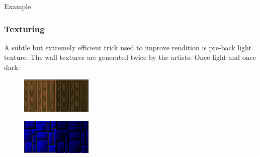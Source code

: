 Example























\subsubsection{Texturing}
A subtle but extremely efficient trick used to improve rendition is pre-back light texture. The wall textures are generated twice by the artists: Once light and once dark:\\
  \begin{figure}[H]
\centering
 \includegraphics[width=\textwidth]{screenshots/baked_lights_wood.png}
 \end{figure}
\par
  \begin{figure}[H]
\centering
 \includegraphics[width=\textwidth]{screenshots/baked_lights_stone.png}
 \end{figure}
